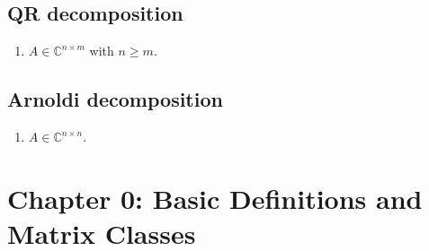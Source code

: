 \documentclass[a4paper, landscape,twocolumn,fontsize=9pt]{scrartcl}
\begin{document}
\subsection*{QR decomposition}
\begin{enumerate}
	\item $A \in \mathbb C^{n \times m}$ with $n \geq m$.
\end{enumerate}

\subsection*{Arnoldi decomposition}
\begin{enumerate}
	\item $A \in \mathbb C^{n \times n}$.
\end{enumerate}


\section*{Chapter 0: Basic Definitions and Matrix Classes}
\end{document}
